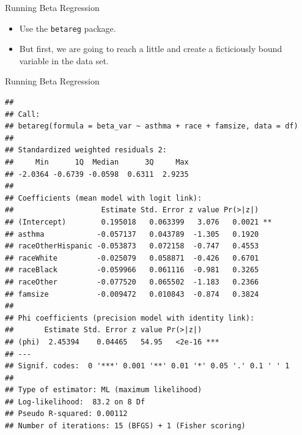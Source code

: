 \begin{frame}[fragile]{Running Beta Regression}

\begin{itemize}
\tightlist
\item
  Use the \texttt{betareg} package.
\item
  But first, we are going to reach a little and create a ficticiously
  bound variable in the data set.
\end{itemize}

\begin{Shaded}
\begin{Highlighting}[]
\OperatorTok{$}\StringTok{ }\NormalTok{(}\NormalTok{, }\NormalTok{), }
                       \OperatorTok{$}
                       \NormalTok{)}
\StringTok{ }\OperatorTok{~}\StringTok{ }\OperatorTok{+}\StringTok{ }\OperatorTok{+}\StringTok{ }
\end{Highlighting}
\end{Shaded}

\end{frame}

\begin{frame}[fragile]{Running Beta Regression}

\tiny

\begin{verbatim}
## 
## Call:
## betareg(formula = beta_var ~ asthma + race + famsize, data = df)
## 
## Standardized weighted residuals 2:
##     Min      1Q  Median      3Q     Max 
## -2.0364 -0.6739 -0.0598  0.6311  2.9235 
## 
## Coefficients (mean model with logit link):
##                    Estimate Std. Error z value Pr(>|z|)   
## (Intercept)        0.195018   0.063399   3.076   0.0021 **
## asthma            -0.057137   0.043789  -1.305   0.1920   
## raceOtherHispanic -0.053873   0.072158  -0.747   0.4553   
## raceWhite         -0.025079   0.058871  -0.426   0.6701   
## raceBlack         -0.059966   0.061116  -0.981   0.3265   
## raceOther         -0.077520   0.065502  -1.183   0.2366   
## famsize           -0.009472   0.010843  -0.874   0.3824   
## 
## Phi coefficients (precision model with identity link):
##       Estimate Std. Error z value Pr(>|z|)    
## (phi)  2.45394    0.04465   54.95   <2e-16 ***
## ---
## Signif. codes:  0 '***' 0.001 '**' 0.01 '*' 0.05 '.' 0.1 ' ' 1 
## 
## Type of estimator: ML (maximum likelihood)
## Log-likelihood:  83.2 on 8 Df
## Pseudo R-squared: 0.00112
## Number of iterations: 15 (BFGS) + 1 (Fisher scoring)
\end{verbatim}

\Large

\end{frame}

